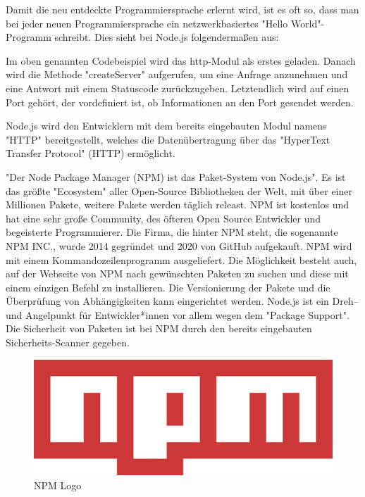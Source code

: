 
Damit die neu entdeckte Programmiersprache erlernt wird, ist es oft so, dass man bei jeder neuen Programmiersprache ein netzwerkbasiertes "Hello World"-Programm schreibt. Dies sieht bei Node.js folgendermaßen aus:


Im oben genannten Codebeispiel wird das http-Modul als erstes geladen. Danach wird die Methode "createServer" aufgerufen, um eine Anfrage anzunehmen und eine Antwort mit einem Statuscode zurückzugeben. Letztendlich wird auf einen Port gehört, der vordefiniert ist, ob Informationen an den Port gesendet werden.

Node.js wird den Entwicklern mit dem bereits eingebauten Modul namens "HTTP" bereitgestellt, welches die Datenübertragung über das "HyperText Transfer Protocol" (HTTP) ermöglicht. \cite{HelloWorld}

\label{sec:npm}

"Der Node Package Manager (NPM) ist das Paket-System von Node.js". \cite{NPMIntro} Es ist das größte "Ecosystem" aller Open-Source Bibliotheken der Welt, mit über einer Millionen Pakete, weitere Pakete werden täglich releast. NPM ist kostenlos und hat eine sehr große Community, des öfteren Open Source Entwickler und begeisterte Programmierer. Die Firma, die hinter NPM steht, die sogenannte NPM INC., wurde 2014 gegründet und 2020 von GitHub aufgekauft.
NPM wird mit einem Kommandozeilenprogramm ausgeliefert. Die Möglichkeit besteht auch, auf der Webseite von NPM nach gewünschten Paketen zu suchen und diese mit einem einzigen Befehl zu installieren. Die Versionierung der Pakete und die Überprüfung von Abhängigkeiten kann eingerichtet werden. Node.js ist ein Dreh– und Angelpunkt für Entwickler*innen vor allem wegen dem "Package Support".
Die Sicherheit von Paketen ist bei NPM durch den bereits eingebauten Sicherheits-Scanner gegeben. \cite{NPM}\cite{NPM2}\cite{NPMIntro}

\begin{figure}[H]
    \centering
    \includegraphics{media/NodeJs/NPM.png}
    \caption{NPM Logo \cite{NPMLOGO}}
\end{figure}


